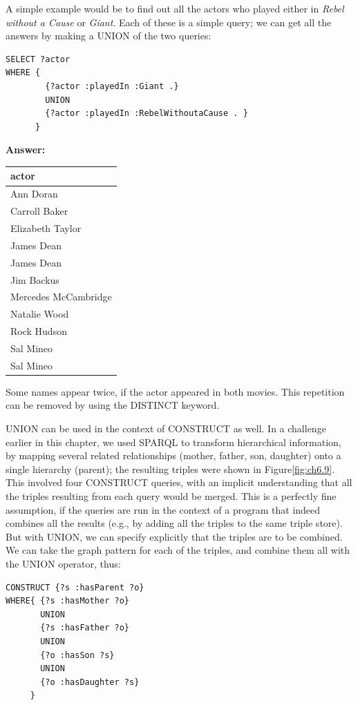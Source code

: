 A simple example would be to find out all the actors who played either
in \emph{Rebel without a Cause} or
\emph{Giant}. Each of these is a simple query; we can get all the
answers by making a UNION of the two queries:


\begin{lstlisting}
SELECT ?actor
WHERE {
        {?actor :playedIn :Giant .}
        UNION
        {?actor :playedIn :RebelWithoutaCause . }
      }
\end{lstlisting}


\textbf{\textbf{Answer:}}

\begin{tabular}{|l|}
\hline
actor\\
\hline
Ann Doran\\
Carroll Baker\\
Elizabeth Taylor\\
James Dean\\
James Dean\\
Jim Backus\\
Mercedes McCambridge\\
Natalie Wood\\
Rock Hudson\\
Sal Mineo\\
Sal Mineo\\
\hline
\end{tabular}

Some names appear twice, if the actor appeared in both movies. This
repetition can be removed by using the DISTINCT keyword.

UNION can be used in the context of CONSTRUCT as well. In a challenge
earlier in this chapter, we used SPARQL to transform hierarchical
information, by mapping several related relationships (mother, father,
son, daughter) onto a single hierarchy (parent); the resulting triples
were shown in Figure\ref{fig:ch6.9}. This involved four CONSTRUCT queries, with an
implicit understanding that all the triples resulting from each query
would be merged. This is a perfectly fine assumption, if the queries are
run in the context of a program that indeed combines all the results
(e.g., by adding all the triples to the same triple store). But with
UNION, we can specify explicitly that the triples are to be combined. We
can take the graph pattern for each of the triples, and combine them all
with the UNION operator, thus:

\begin{lstlisting}
CONSTRUCT {?s :hasParent ?o}
WHERE{ {?s :hasMother ?o}
       UNION
       {?s :hasFather ?o}
       UNION
       {?o :hasSon ?s}
       UNION
       {?o :hasDaughter ?s}
     }
\end{lstlisting}

